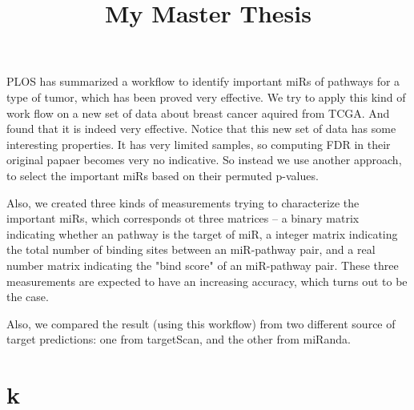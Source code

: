 \documentclass{scrartcl}
\title{My Master Thesis}
\begin{document}
\maketitle
\begin{abstruct}
  PLOS has summarized a workflow\cite{???} to identify important miRs of
  pathways for a type of tumor, which has been proved very effective. We try to
  apply this kind of work flow on a new set of data about breast cancer aquired
  from TCGA. And found that it is indeed very effective. Notice that this new
  set of data has some interesting properties. It has very limited samples, so
  computing FDR in their original papaer becomes very no indicative. So instead
  we use another approach, to select the important miRs based on their permuted
  p-values.

  Also, we created three kinds of measurements trying to characterize the important
  miRs, which corresponds ot three matrices -- a binary matrix indicating whether
  an pathway is the target of miR, a integer matrix indicating the total number
  of binding sites between an miR-pathway pair, and a real number matrix
  indicating the "bind score" of an miR-pathway pair. These three measurements are
  expected to have an increasing accuracy, which turns out to be the case.

  Also, we compared the result (using this workflow) from two different source
  of target predictions: one from targetScan\cite{???}, and the other from
  miRanda\cite{???}.

\end{abstruct}
\section{k}
\end{document}
